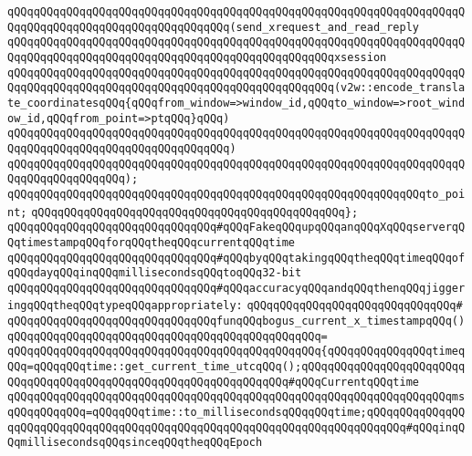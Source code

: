 \verb|qQQqqQQqqQQqqQQqqQQqqQQqqQQqqQQqqQQqqQQqqQQqqQQqqQQqqQQqqQQqqQQqqQQqqQQqqQQqqQQqqQQqqQQqqQQqqQQqqQQqqQQq(send_xrequest_and_read_reply|\newline
\verb|qQQqqQQqqQQqqQQqqQQqqQQqqQQqqQQqqQQqqQQqqQQqqQQqqQQqqQQqqQQqqQQqqQQqqQQqqQQqqQQqqQQqqQQqqQQqqQQqqQQqqQQqqQQqqQQqqQQqqQQqxsession|\newline
\verb|qQQqqQQqqQQqqQQqqQQqqQQqqQQqqQQqqQQqqQQqqQQqqQQqqQQqqQQqqQQqqQQqqQQqqQQqqQQqqQQqqQQqqQQqqQQqqQQqqQQqqQQqqQQqqQQqqQQqqQQq(v2w::encode_translate_coordinatesqQQq{qQQqfrom_window=>window_id,qQQqto_window=>root_window_id,qQQqfrom_point=>ptqQQq}qQQq)|\newline
\verb|qQQqqQQqqQQqqQQqqQQqqQQqqQQqqQQqqQQqqQQqqQQqqQQqqQQqqQQqqQQqqQQqqQQqqQQqqQQqqQQqqQQqqQQqqQQqqQQqqQQqqQQq)|\newline
\verb|qQQqqQQqqQQqqQQqqQQqqQQqqQQqqQQqqQQqqQQqqQQqqQQqqQQqqQQqqQQqqQQqqQQqqQQqqQQqqQQqqQQqqQQq);|\newline
\newline
\verb|qQQqqQQqqQQqqQQqqQQqqQQqqQQqqQQqqQQqqQQqqQQqqQQqqQQqqQQqqQQqqQQqto_point;|\newline
\verb|qQQqqQQqqQQqqQQqqQQqqQQqqQQqqQQqqQQqqQQqqQQqqQQq};|\newline
\newline
\verb|qQQqqQQqqQQqqQQqqQQqqQQqqQQqqQQq#qQQqFakeqQQqupqQQqanqQQqXqQQqserverqQQqtimestampqQQqforqQQqtheqQQqcurrentqQQqtime|\newline
\verb|qQQqqQQqqQQqqQQqqQQqqQQqqQQqqQQq#qQQqbyqQQqtakingqQQqtheqQQqtimeqQQqofqQQqdayqQQqinqQQqmillisecondsqQQqtoqQQq32-bit|\newline
\verb|qQQqqQQqqQQqqQQqqQQqqQQqqQQqqQQq#qQQqaccuracyqQQqandqQQqthenqQQqjiggeringqQQqtheqQQqtypeqQQqappropriately:|\newline
\verb|qQQqqQQqqQQqqQQqqQQqqQQqqQQqqQQq#|\newline
\verb|qQQqqQQqqQQqqQQqqQQqqQQqqQQqqQQqfunqQQqbogus_current_x_timestampqQQq()|\newline
\verb|qQQqqQQqqQQqqQQqqQQqqQQqqQQqqQQqqQQqqQQqqQQqqQQq=|\newline
\verb|qQQqqQQqqQQqqQQqqQQqqQQqqQQqqQQqqQQqqQQqqQQqqQQq{qQQqqQQqqQQqqQQqtimeqQQq=qQQqqQQqtime::get_current_time_utcqQQq();qQQqqQQqqQQqqQQqqQQqqQQqqQQqqQQqqQQqqQQqqQQqqQQqqQQqqQQqqQQqqQQqqQQq#qQQqCurrentqQQqtime|\newline
\verb|qQQqqQQqqQQqqQQqqQQqqQQqqQQqqQQqqQQqqQQqqQQqqQQqqQQqqQQqqQQqqQQqqQQqmsqQQqqQQqqQQq=qQQqqQQqtime::to_millisecondsqQQqqQQqtime;qQQqqQQqqQQqqQQqqQQqqQQqqQQqqQQqqQQqqQQqqQQqqQQqqQQqqQQqqQQqqQQqqQQqqQQqqQQq#qQQqinqQQqmillisecondsqQQqsinceqQQqtheqQQqEpoch|\newline
